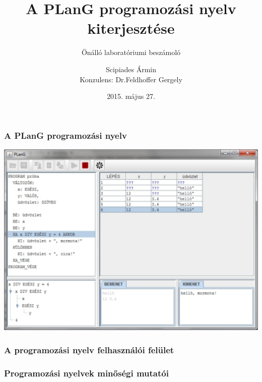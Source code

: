 \documentclass{beamer}
\title{A PLanG programozási nyelv kiterjesztése}
\subtitle{Önálló laboratóriumi beszámoló}
\author{Scipiades Ármin\\\bigskip Konzulens: Dr.\thinspace Feldhoffer Gergely}
\date{2015. május 27.}
\begin{document}
\frame{\titlepage}

\begin{frame}
	\frametitle{A PLanG programozási nyelv}
	\centering
	\includegraphics[width=\linewidth,height=\textheight,keepaspectratio]{images/plang.pdf}
\end{frame}

\begin{frame}
	\frametitle{A programozási nyelv felhasználói felület}	
	\centering
	\begin{adjustbox}{max totalsize={\textwidth}{\textheight},center}
	
	\end{adjustbox}	
\end{frame}

\begin{frame}
	\frametitle{Programozási nyelvek minőségi mutatói}
	\centering
	\begin{adjustbox}{max totalsize={\textwidth}{\textheight},center}
	
	\end{adjustbox}
\end{frame}
\end{document}
